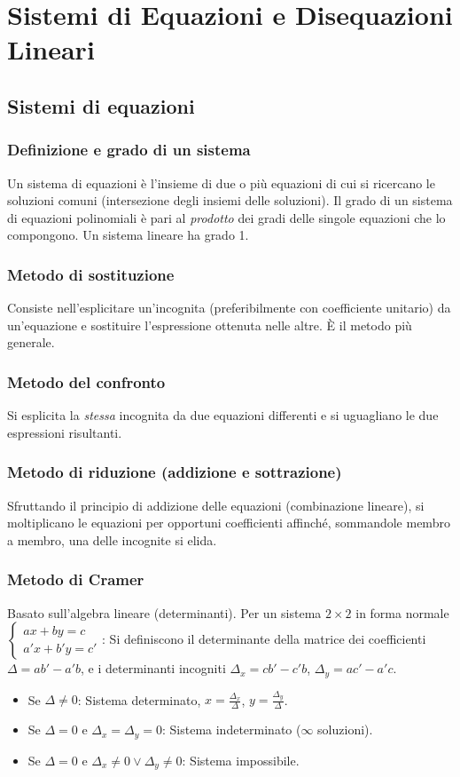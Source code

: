 \section{Sistemi di Equazioni e Disequazioni Lineari}
\subsection{Sistemi di equazioni}
\subsubsection{Definizione e grado di un sistema}
Un sistema di equazioni è l'insieme di due o più equazioni di cui si ricercano le soluzioni comuni (intersezione degli insiemi delle soluzioni). Il grado di un sistema di equazioni polinomiali è pari al \textit{prodotto} dei gradi delle singole equazioni che lo compongono. Un sistema lineare ha grado 1.

\subsubsection{Metodo di sostituzione}
Consiste nell'esplicitare un'incognita (preferibilmente con coefficiente unitario) da un'equazione e sostituire l'espressione ottenuta nelle altre. È il metodo più generale.

\subsubsection{Metodo del confronto}
Si esplicita la \textit{stessa} incognita da due equazioni differenti e si uguagliano le due espressioni risultanti.

\subsubsection{Metodo di riduzione (addizione e sottrazione)}
Sfruttando il principio di addizione delle equazioni (combinazione lineare), si moltiplicano le equazioni per opportuni coefficienti affinché, sommandole membro a membro, una delle incognite si elida.

\subsubsection{Metodo di Cramer}
Basato sull'algebra lineare (determinanti). Per un sistema $2 \times 2$ in forma normale $\begin{cases} ax+by=c \\ a'x+b'y=c' \end{cases}$:
Si definiscono il determinante della matrice dei coefficienti $\Delta = ab' - a'b$, e i determinanti incogniti $\Delta_x = cb' - c'b$, $\Delta_y = ac' - a'c$.
\begin{itemize}
    \item Se $\Delta \neq 0$: Sistema determinato, $x = \frac{\Delta_x}{\Delta}$, $y = \frac{\Delta_y}{\Delta}$.
    \item Se $\Delta = 0$ e $\Delta_x = \Delta_y = 0$: Sistema indeterminato ($\infty$ soluzioni).
    \item Se $\Delta = 0$ e $\Delta_x \neq 0 \lor \Delta_y \neq 0$: Sistema impossibile.
\end{itemize}


